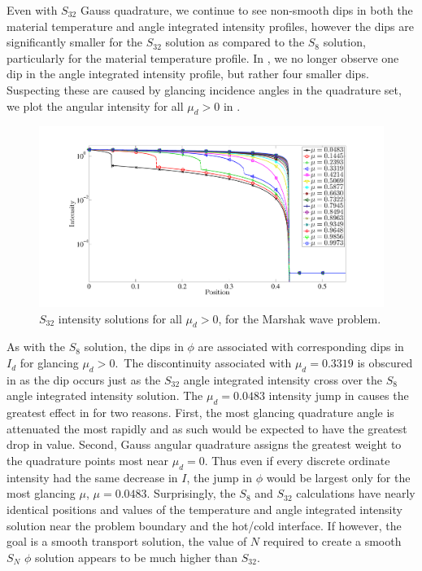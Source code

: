 Even with $S_{32}$ Gauss quadrature, we continue to see non-smooth dips in both the material temperature and angle integrated intensity profiles, however the dips are significantly smaller for the $S_{32}$ solution as compared to the $S_8$ solution, particularly for the material temperature profile.
In , we no longer observe one dip in the angle integrated intensity profile, but rather four smaller dips.
Suspecting these are caused by glancing incidence angles in the quadrature set, we plot the angular intensity for all $\mu_d > 0$ in .
\begin{figure}[!htp]
\centering
\includegraphics[width=16cm,trim=1.5in  0.2in 0.5in 0.75in,clip=true]{chapter6_grey_radtran/Dissertation_Data/S32_Intensity.pdf}
\caption{$S_{32}$ intensity solutions for all $\mu_d > 0$, for the Marshak wave problem.}
\label{fig:s32_intensity}
\end{figure}
As with the $S_8$ solution, the dips in $\phi$ are associated with corresponding dips in $I_d$ for glancing $\mu_d>0$.\
The discontinuity associated with $\mu_d = 0.3319$ is obscured in  as the dip occurs just as the $S_{32}$ angle integrated intensity cross over the $S_8$ angle integrated intensity solution.
The $\mu_d=0.0483$ intensity jump in \fig{fig:s32_intensity} causes the greatest effect in \fig{fig:s8_vs_s32_radiation} for two reasons.  
First, the most glancing quadrature angle is attenuated the most rapidly and as such would be expected to have the greatest drop in value.
Second, Gauss angular quadrature assigns the greatest weight to the quadrature points most near $\mu_d = 0$. 
Thus even if every discrete ordinate intensity had the same decrease in $I$, the jump in $\phi$ would be largest only for the most glancing $\mu$, $\mu=0.0483$.
Surprisingly, the $S_8$ and $S_{32}$ calculations have nearly identical positions and values of the temperature and angle integrated intensity solution near the problem boundary and the hot/cold interface.  
If however, the goal is a smooth transport solution, the value of $N$ required to create a smooth $S_N$ $\phi$ solution appears to be much higher than $S_{32}$.


